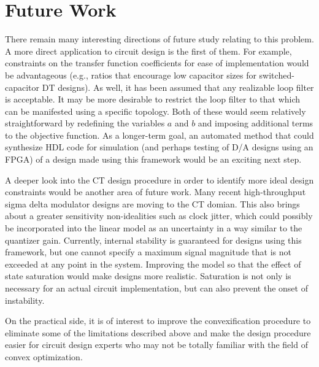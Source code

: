 \section{Future Work}
\label{sec:conclusions-future}

There remain many interesting directions of future study relating to this problem. A more direct application to circuit design is the first of them. For example, constraints on the transfer function coefficients for ease of implementation would be advantageous (e.g., ratios that encourage low capacitor sizes for switched-capacitor \gls{DT} designs). As well, it has been assumed that any realizable loop filter is acceptable. It may be more desirable to restrict the loop filter to that which can be manifested using a specific topology. Both of these would seem relatively straightforward by redefining the variables $a$ and $b$ and imposing additional terms to the objective function. As a longer-term goal, an automated method that could synthesize \gls{HDL} code for simulation (and perhaps testing of \gls{D/A} designs using an \gls{FPGA}) of a design made using this framework would be an exciting next step.

A deeper look into the \gls{CT} design procedure in order to identify more ideal design constraints would be another area of future work. Many recent high-throughput sigma delta modulator designs are moving to the \gls{CT} domian. This also brings about a greater sensitivity non-idealities such as clock jitter, which could possibly be incorporated into the linear model as an uncertainty in a way similar to the quantizer gain. Currently, internal stability is guaranteed for designs using this framework, but one cannot specify a maximum signal magnitude that is not exceeded at any point in the system. Improving the model so that the effect of state saturation would make designs more realistic. Saturation is not only is necessary for an actual circuit implementation, but can also prevent the onset of instability.

On the practical side, it is of interest to improve the convexification procedure to eliminate some of the limitations described above and make the design procedure easier for circuit design experts who may not be totally familiar with the field of convex optimization.